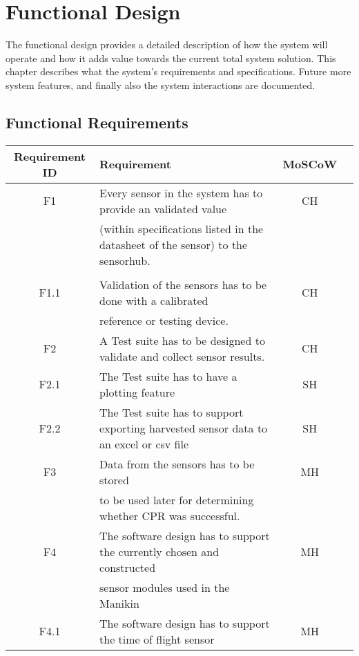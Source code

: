\chapter{Functional Design}
\label{chapter:intro} 
The functional design provides a detailed description of how the system will operate and how it adds value towards the current total system solution.
\newline
This chapter describes what the system's requirements and specifications. Future more system features, and finally also the system interactions are documented.

\section{Functional Requirements}
\begin{tabular}{ |c|l|c|c| } 
 \hline
 Requirement ID & Requirement & MoSCoW \\ 
 \hline
 \hline
 F1    & Every sensor in the system has to provide an validated value  & CH \\ 
       & (within specifications listed in the datasheet of the sensor) to the sensorhub.  &  \\
       &                                                                                  &  \\
\hline
 F1.1  & Validation of the sensors has to be done with a calibrated                       & CH \\
       & reference or testing device.                                                     &   \\
\hline
 F2    & A Test suite has to be designed to validate and collect sensor results.          & CH \\
 \hline
 F2.1  & The Test suite has to have a plotting feature                                    & SH \\
 \hline 
 F2.2  & The Test suite has to support exporting harvested sensor data to an excel or csv file & SH \\
 \hline
 F3    & Data from the sensors has to be stored & MH\\
       & to be used later for determining whether CPR was successful.  & \\
\hline
 F4    & The software design has to support the currently chosen and constructed & MH  \\
       & sensor modules used in the Manikin & \\
 \hline
 F4.1  & The software design has to support the time of flight sensor & MH \\

\end{tabular}
